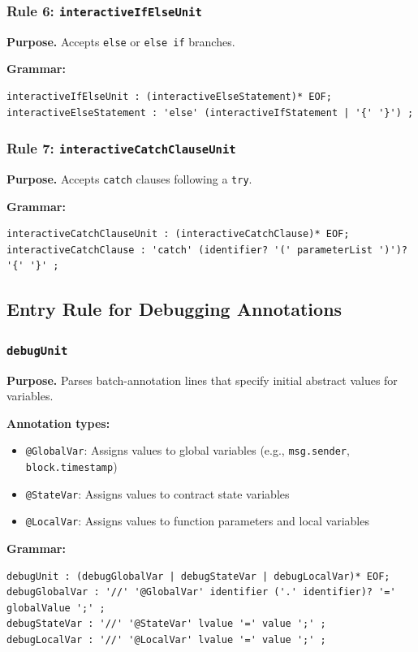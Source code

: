 \documentclass[pdflatex,sn-basic]{sn-jnl}%
\theoremstyle{thmstyleone}%
\theoremstyle{thmstyletwo}%
\theoremstyle{thmstylethree}%
\begin{document}
\subsubsection{Rule 6: \texttt{interactiveIfElseUnit}}
\noindent\textbf{Purpose.} Accepts \texttt{else} or \texttt{else if} branches.

\noindent\textbf{Grammar:}
\begin{verbatim}
interactiveIfElseUnit : (interactiveElseStatement)* EOF;
interactiveElseStatement : 'else' (interactiveIfStatement | '{' '}') ;
\end{verbatim}

\subsubsection{Rule 7: \texttt{interactiveCatchClauseUnit}}
\noindent\textbf{Purpose.} Accepts \texttt{catch} clauses following a \texttt{try}.

\noindent\textbf{Grammar:}
\begin{verbatim}
interactiveCatchClauseUnit : (interactiveCatchClause)* EOF;
interactiveCatchClause : 'catch' (identifier? '(' parameterList ')')? '{' '}' ;
\end{verbatim}

\subsection{Entry Rule for Debugging Annotations}

\subsubsection{\texttt{debugUnit}}
\noindent\textbf{Purpose.} Parses batch-annotation lines that specify initial abstract values for variables.

\noindent\textbf{Annotation types:}
\begin{itemize}
  \item \texttt{@GlobalVar}: Assigns values to global variables (e.g., \texttt{msg.sender}, \texttt{block.timestamp})
  \item \texttt{@StateVar}: Assigns values to contract state variables
  \item \texttt{@LocalVar}: Assigns values to function parameters and local variables
\end{itemize}

\noindent\textbf{Grammar:}
\begin{verbatim}
debugUnit : (debugGlobalVar | debugStateVar | debugLocalVar)* EOF;
debugGlobalVar : '//' '@GlobalVar' identifier ('.' identifier)? '=' globalValue ';' ;
debugStateVar : '//' '@StateVar' lvalue '=' value ';' ;
debugLocalVar : '//' '@LocalVar' lvalue '=' value ';' ;
\end{verbatim}
\end{document}
